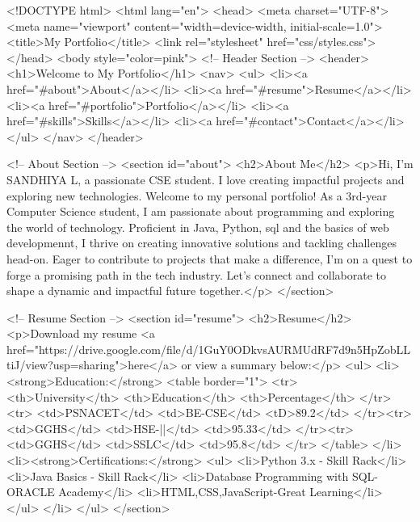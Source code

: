 <!DOCTYPE html>
<html lang="en">
<head>
    <meta charset="UTF-8">
    <meta name="viewport" content="width=device-width, initial-scale=1.0">
    <title>My Portfolio</title>
    <link rel="stylesheet" href="css/styles.css">
</head>
<body style="color=pink">
    <!-- Header Section -->
    <header>
        <h1>Welcome to My Portfolio</h1>
        <nav>
            <ul>
                <li><a href="#about">About</a></li>
                <li><a href="#resume">Resume</a></li>
                <li><a href="#portfolio">Portfolio</a></li>
                <li><a href="#skills">Skills</a></li>
                <li><a href="#contact">Contact</a></li>
            </ul>
        </nav>
    </header>

    <!-- About Section -->
    <section id="about">
        <h2>About Me</h2>
        <p>Hi, I'm SANDHIYA L, a passionate CSE student. I love creating impactful projects and exploring new technologies. Welcome to my personal portfolio! As a  3rd-year Computer Science student, I am passionate about programming and exploring the world of technology. Proficient in  Java, Python, sql and the basics of web developmennt, I thrive on creating innovative solutions and tackling challenges head-on. Eager to contribute to projects that make a difference, I'm on a quest to forge a promising path in the tech industry. Let's connect and collaborate to shape a dynamic and impactful future together.</p>
    </section>

    <!-- Resume Section -->
    <section id="resume">
        <h2>Resume</h2>
        <p>Download my resume <a href="https://drive.google.com/file/d/1GuY0ODkvsAURMUdRF7d9n5HpZobLLtiJ/view?usp=sharing">here</a> or view a summary below:</p>
        <ul>
            <li><strong>Education:</strong>
			<table border="1">
			<tr>
			<th>University</th>
			<th>Education</th>
			<th>Percentage</th>
			</tr>
			<tr>
			<td>PSNACET</td>
			<td>BE-CSE</td>
			<tD>89.2</td>
			</tr><tr>
			<td>GGHS</td>
			<td>HSE-||</td>
			<td>95.33</td>
			</tr><tr>
			<td>GGHS</td>
			<td>SSLC</td>
			<td>95.8</td>
			</tr>
			</table>
			</li>
            <li><strong>Certifications:</strong>
			<ul>
			<li>Python 3.x - Skill Rack</li>
			<li>Java Basics - Skill Rack</li>
			<li>Database Programming with SQL-ORACLE Academy</li>
			<li>HTML,CSS,JavaScript-Great Learning</li>
			</ul>
			</li>
        </ul>
    </section>

